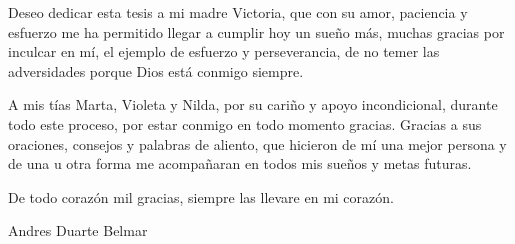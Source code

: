 \thispagestyle{empty}
\begin{titlepage}
  {
  \vspace*{6.0in}
  \begin{flushright}

     Deseo  dedicar esta tesis a mi madre Victoria, que con su amor, paciencia y esfuerzo me ha permitido llegar a cumplir hoy un sueño más, muchas gracias por inculcar en mí, el ejemplo de esfuerzo y perseverancia, de no temer las adversidades porque Dios está conmigo siempre. 
     
     \hfill
    
    A mis tías Marta, Violeta y Nilda, por su cariño y apoyo incondicional, durante todo este proceso, por estar conmigo en todo momento gracias. Gracias a sus oraciones, consejos y palabras de aliento, que hicieron de mí una mejor persona y de una u otra forma me acompañaran en todos mis sueños y metas futuras.
    
     \hfill
    
    De todo corazón mil gracias, siempre las llevare en mi corazón.
    
       \hfill
    
    Andres Duarte Belmar

  \end{flushright}
  }
\end{titlepage}